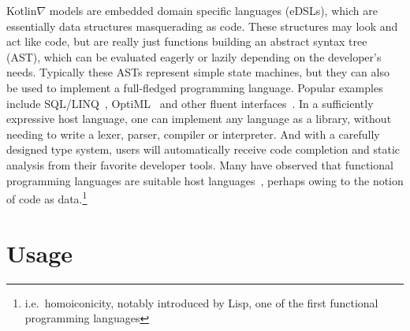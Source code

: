 \documentclass[12pt,initial,twoside,maitrise]{dms}
\numberwithin{equation}{section}
\numberwithin{table}{chapter}
\numberwithin{figure}{chapter}
\begin{document}
Kotlin$\nabla$ models are embedded domain specific languages (eDSLs), which are essentially data structures masquerading as code. These structures may look and act like code, but are really just functions building an abstract syntax tree (AST), which can be evaluated eagerly or lazily depending on the developer's needs. Typically these ASTs represent simple state machines, but they can also be used to implement a full-fledged programming language. Popular examples include SQL/LINQ~\cite{meijer2006linq}, OptiML~\cite{sujeeth2011optiml} and other fluent interfaces~\cite{fowler05fluent}. In a sufficiently expressive host language, one can implement any language as a library, without needing to write a lexer, parser, compiler or interpreter. And with a carefully designed type system, users will automatically receive code completion and static analysis from their favorite developer tools. Many have observed that functional programming languages are suitable host languages~\cite{elliott2003compiling,rompf2010lightweight}, perhaps owing to the notion of code as data.\footnote{i.e.\ homoiconicity, notably introduced by Lisp, one of the first functional programming languages}

\section{Usage}
\end{document}
